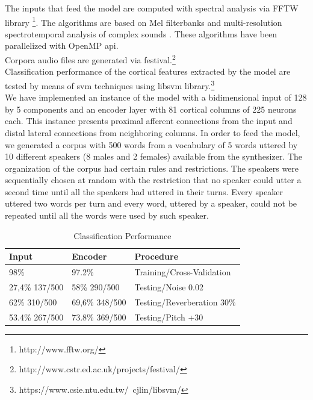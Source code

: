 \documentclass[11pt,a4paper]{article}
\begin{document}
The inputs that feed the model are computed
with spectral analysis via FFTW library \footnote{http://www.fftw.org/}.
The algorithms are based on 
Mel filterbanks and multi-resolution
spectrotemporal analysis of complex sounds \cite{taishih_2005}.
These algorithms have been parallelized with OpenMP \gls{api}. \\

Corpora audio files are generated via \gls{festival}.\footnote{http://www.cstr.ed.ac.uk/projects/festival/} \\

Classification performance of the cortical features extracted by the model are tested by means of
\gls{svm} techniques using \gls{libsvm} library.\footnote{https://www.csie.ntu.edu.tw/~cjlin/libsvm/} \\

We have implemented an instance of the model with a bidimensional input
of 128 by 5 components and an encoder layer
with 81 cortical columns of 225 neurons each.
This instance presents proximal afferent connections
from the input and distal lateral connections from
neighboring columns.
In order to feed the model, we generated a corpus with 500 words from a vocabulary of
5 words uttered by 10 different speakers (8 males and 2 females) available from the synthesizer.
The organization of the corpus had certain rules and restrictions.
The speakers were sequentially chosen at random with the restriction that no speaker could
utter a second time until all the speakers had uttered in their turns.
Every speaker uttered two words per turn and every word, uttered by a speaker,
could not be repeated until all the words were used by such speaker. \\

\begin{table}[]
\centering
\caption{Classification Performance}
\label{classification_performances}
\begin{tabular}{|l|l|l|}
\hline
Input          & Encoder        & Procedure                  \\ \hline
98\%           & 97.2\%         & Training/Cross-Validation  \\ \hline
27,4\% 137/500 & 58\% 290/500   & Testing/Noise 0.02         \\ \hline
62\% 310/500   & 69,6\% 348/500 & Testing/Reverberation 30\% \\ \hline
53.4\% 267/500 & 73.8\% 369/500 & Testing/Pitch +30          \\ \hline
\end{tabular}
\end{table}
\end{document}
